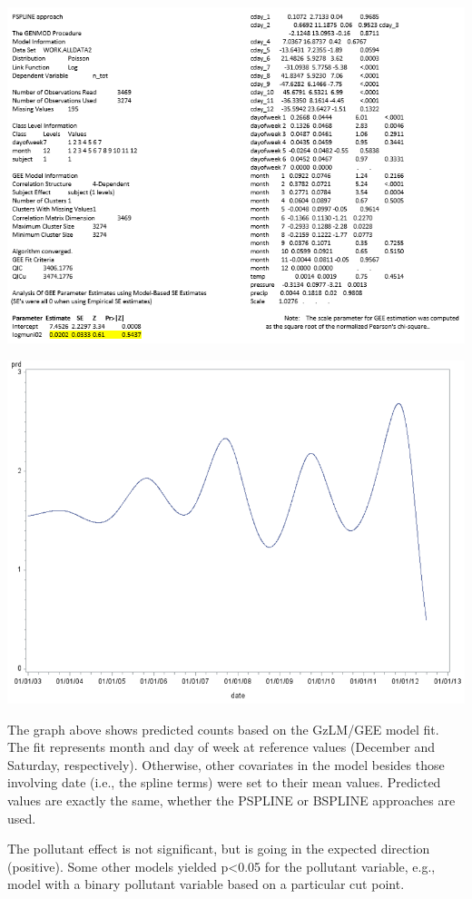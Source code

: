 \documentclass[
  9pt,
  ignorenonframetext,
]{beamer}
\begin{document}
\begin{frame}{}
\protect\hypertarget{section-17}{}
\begin{center}\includegraphics[width=0.7\linewidth]{figs_L12/f19} \end{center}
\end{frame}

\begin{frame}{}
\protect\hypertarget{section-18}{}
\begin{center}\includegraphics[width=0.5\linewidth]{figs_L12/f20} \end{center}

The graph above shows predicted counts based on the GzLM/GEE model fit.
The fit represents month and day of week at reference values (December
and Saturday, respectively). Otherwise, other covariates in the model
besides those involving date (i.e., the spline terms) were set to their
mean values. Predicted values are exactly the same, whether the PSPLINE
or BSPLINE approaches are used.

The pollutant effect is not significant, but is going in the expected
direction (positive). Some other models yielded p\textless0.05 for the
pollutant variable, e.g., model with a binary pollutant variable based
on a particular cut point.
\end{frame}
\end{document}
